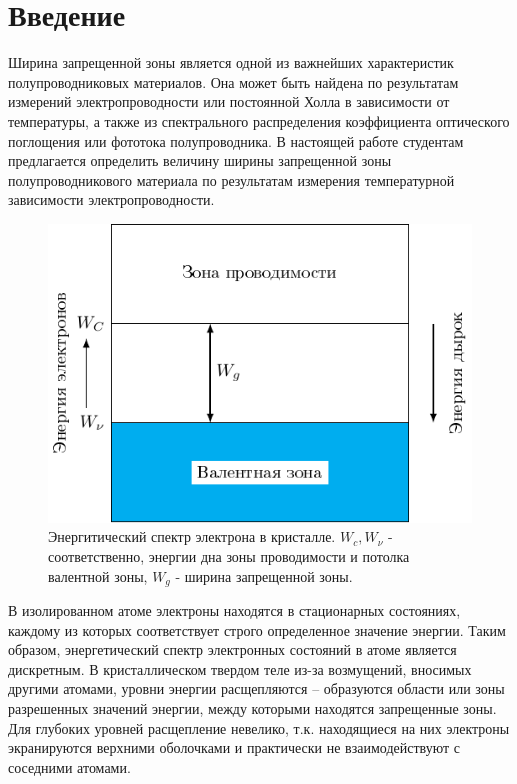 

\renewcommand{\phi}{\varphi}



\def\labauthors{Виноградов И.Д., Шиков А.П.}
\def\labgroup{430}
\def\labnumber{1}
\def\labtheme{Измерение ширины запрещенной зоны}



\newpage
\section*{Введение}
Ширина запрещенной зоны является одной из важнейших характеристик полупроводниковых материалов. Она может быть найдена
по результатам измерений электропроводности или постоянной Холла в зависимости от температуры, а также из спектрального 
распределения коэффициента оптического поглощения или фототока полупроводника. В настоящей работе студентам предлагается
определить величину ширины запрещенной зоны полупроводникового материала по результатам измерения температурной зависимости 
электропроводности. 
\begin{figure}
	\includegraphics[width = \linewidth]{img/cond.pdf}
	\caption{Энергитический спектр электрона в кристалле. $W_c,W_{\nu}$ - соответственно, энергии дна зоны проводимости и потолка валентной зоны, $W_g$ - ширина запрещенной зоны.}
	\label{fig:cond}
\end{figure}
В изолированном атоме электроны находятся в стационарных состояниях, каждому из которых соответствует строго
определенное значение энергии. Таким образом, энергетический спектр электронных состояний в атоме является дискретным. В
кристаллическом твердом теле из-за возмущений, вносимых другими атомами, уровни энергии расщепляются – образуются
области или зоны разрешенных значений энергии, между которыми находятся запрещенные зоны. Для глубоких уровней
расщепление невелико, т.к. находящиеся на них электроны экранируются верхними оболочками и практически не
взаимодействуют с соседними атомами. 

